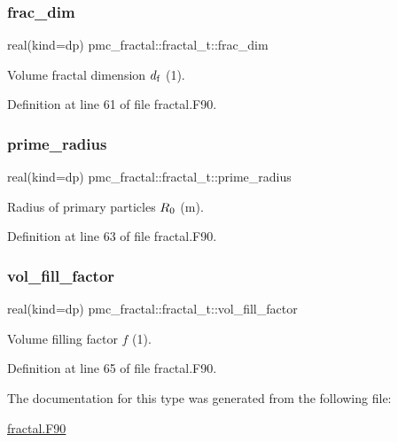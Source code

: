 \subsubsection{\texorpdfstring{frac\+\_\+dim}{frac\_dim}}
{\footnotesize\ttfamily real(kind=dp) pmc\+\_\+fractal\+::fractal\+\_\+t\+::frac\+\_\+dim}



Volume fractal dimension $d_{\rm f}$ (1). 



Definition at line 61 of file fractal.\+F90.

\mbox{\label{structpmc__fractal_1_1fractal__t_a8695004688e430cd15f1a3fc698081b8}} 
\subsubsection{\texorpdfstring{prime\+\_\+radius}{prime\_radius}}
{\footnotesize\ttfamily real(kind=dp) pmc\+\_\+fractal\+::fractal\+\_\+t\+::prime\+\_\+radius}



Radius of primary particles $R_{\rm 0}$ (m). 



Definition at line 63 of file fractal.\+F90.

\mbox{\label{structpmc__fractal_1_1fractal__t_ae749b3efb3fbc29b095bbdd485c311e7}} 
\subsubsection{\texorpdfstring{vol\+\_\+fill\+\_\+factor}{vol\_fill\_factor}}
{\footnotesize\ttfamily real(kind=dp) pmc\+\_\+fractal\+::fractal\+\_\+t\+::vol\+\_\+fill\+\_\+factor}



Volume filling factor $f$ (1). 



Definition at line 65 of file fractal.\+F90.



The documentation for this type was generated from the following file\+:\begin{DoxyCompactItemize}
\item 
\mbox{\hyperlink{fractal_8_f90}{fractal.\+F90}}\end{DoxyCompactItemize}
